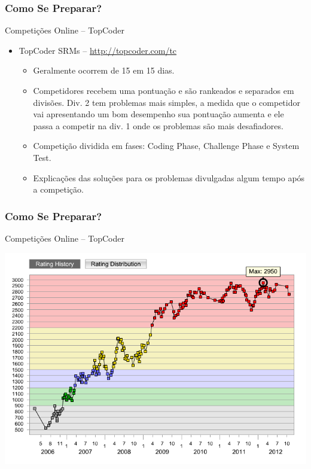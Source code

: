 \begin{frame}
\frametitle{Como Se Preparar?}
\begin{block}{Competições Online -- TopCoder}
\begin{itemize}
	\item TopCoder SRMs -- \url{http://topcoder.com/tc}
	\begin{itemize}
		\item Geralmente ocorrem de 15 em 15 dias. 
		\item Competidores recebem uma pontuação e são rankeados e separados em divisões. Div. 2 tem problemas mais simples, a medida que o competidor vai apresentando um bom desempenho sua pontuação aumenta e ele passa a competir na div. 1 onde os problemas são mais desafiadores.
		\item Competição dividida em fases: Coding Phase, Challenge Phase e System Test.
		\item Explicações das soluções para os problemas divulgadas algum tempo após a competição.
	\end{itemize}
\end{itemize}
\end{block}
\end{frame}

\begin{frame}
\frametitle{Como Se Preparar?}
\begin{block}{Competições Online -- TopCoder}
\begin{center}
	\includegraphics[width=.7\textwidth]{figuras/tcrating.png}
\end{center}
\end{block}
\end{frame}
	
